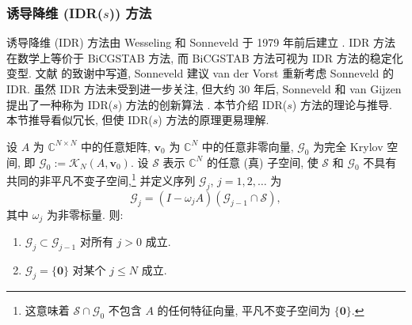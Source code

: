\subsubsection{{诱导降维 (IDR($s$)) 方法}}\label{subsec:idr-method}
{诱导降维 (IDR) 方法由 Wesseling 和 Sonneveld 于 1979 年前后建立 . IDR 方法在数学上等价于 BiCGSTAB 方法, 而 BiCGSTAB 方法可视为 IDR 方法的稳定化变型. 文献  的致谢中写道, Sonneveld 建议 van der Vorst 重新考虑 Sonneveld 的 IDR.}
{虽然 IDR 方法未受到进一步关注, 但大约 30 年后, Sonneveld 和 van Gijzen 提出了一种称为 IDR($s$) 方法的创新算法 . 本节介绍 IDR($s$) 方法的理论与推导. 本节推导看似冗长, 但使 IDR($s$) 方法的原理更易理解.}
\par{}
\begin{Theorem}\label{thm:idr-dimension-reduction}
{设 $A$ 为 $\mathbb C^{N\times N}$ 中的任意矩阵, $\bm v_0$ 为 $\mathbb C^N$ 中的任意非零向量, $\mathcal G_0$ 为完全 Krylov 空间, 即 $\mathcal G_0:=\mathcal K_N(A,\bm v_0)$. 设 $\mathcal S$ 表示 $\mathbb C^N$ 的任意 (真) 子空间, 使 $\mathcal S$ 和 $\mathcal G_0$ 不具有共同的非平凡不变子空间,}\footnote{{这意味着 $\mathcal S\cap\mathcal G_0$ 不包含 $A$ 的任何特征向量, 平凡不变子空间为 $\{\bm0\}$.}}
{并定义序列 $\mathcal G_j$, $j=1,2,\ldots$ 为}
\begin{equation}\label{eq:idr-subspace-recurrence}\mathcal G_j=(I-\omega_jA)(\mathcal G_{j-1}\cap\mathcal S),\end{equation}
{其中 $\omega_j$ 为非零标量. 则:}
\begin{enumerate}[label=(\arabic*)]
\item $\mathcal G_j\subset\mathcal G_{j-1}$ {对所有 $j>0$ 成立.}
\item $\mathcal G_j=\{\bm0\}$ {对某个 $j\le N$ 成立.}
\end{enumerate}\end{Theorem}
